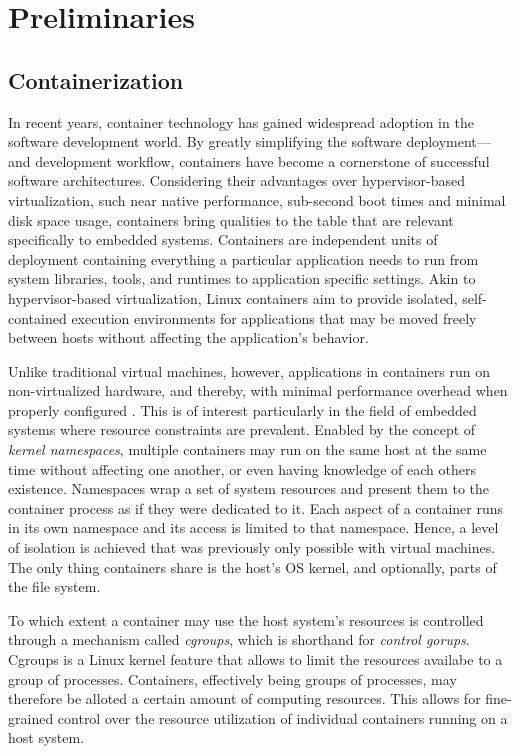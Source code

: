 

\chapter{Preliminaries}\label{chapter:preliminaries}


\section{Containerization}

In recent years, container technology has gained widespread adoption in the software development world. By greatly simplifying the software deployment—and development workflow, containers have become a cornerstone of successful software architectures.
Considering their advantages over hypervisor-based virtualization, such near native performance, sub-second boot times \cite{felter2015updated}\cite{morabito2015hypervisors} and minimal disk space usage, containers bring qualities to the table that are relevant specifically to embedded systems.
Containers are independent units of deployment containing everything a particular application needs to run from system libraries, tools, and runtimes to application specific settings. 
Akin to hypervisor-based virtualization, Linux containers aim to provide isolated, self-contained execution environments for applications that may be moved freely between hosts without affecting the application’s behavior.

Unlike traditional virtual machines, however, applications in containers run on non-virtualized hardware, and thereby, with minimal performance overhead when properly configured \cite{felter2015updated}\cite{morabito2015hypervisors}. This is of interest particularly in the field of embedded systems where resource constraints are prevalent.
Enabled by the concept of \emph{kernel namespaces}, multiple containers may run on the same host at the same time without affecting one another, or even having knowledge of each others existence. 
Namespaces wrap a set of system resources and present them to the container process as if they were dedicated to it. Each aspect of a container runs in its own namespace and its access is limited to that namespace. Hence, a level of isolation is achieved that was previously only possible with virtual machines. The only thing containers share is the host’s OS kernel, and optionally, parts of the file system.

To which extent a container may use the host system's resources is controlled through a mechanism called \emph{cgroups}, which is shorthand for \emph{control gorups}. 
Cgroups is a Linux kernel feature that allows to limit the resources availabe to a group of processes. Containers, effectively being groups of processes, may therefore be alloted a certain amount of computing resources. This allows for fine-grained control over the resource utilization of individual containers running on a host system.

